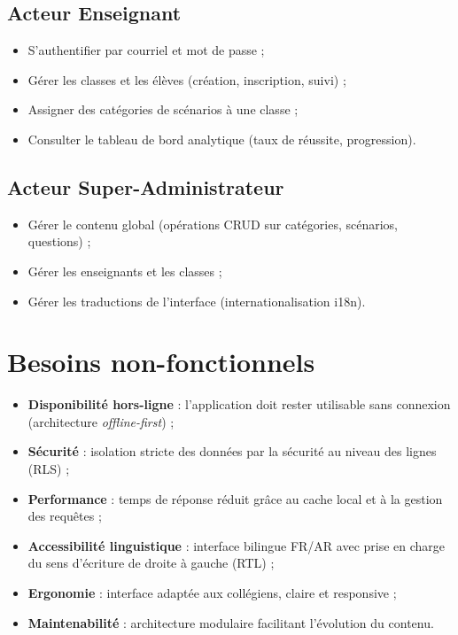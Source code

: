 \documentclass[12pt, a4paper, oneside]{report}
\begin{document}
\subsection{Acteur Enseignant}
\begin{itemize}[leftmargin=*]
  \item S'authentifier par courriel et mot de passe ;
  \item Gérer les classes et les élèves (création, inscription, suivi) ;
  \item Assigner des catégories de scénarios à une classe ;
  \item Consulter le tableau de bord analytique (taux de réussite, progression).
\end{itemize}

\subsection{Acteur Super-Administrateur}
\begin{itemize}[leftmargin=*]
  \item Gérer le contenu global (opérations CRUD sur catégories, scénarios, questions) ;
  \item Gérer les enseignants et les classes ;
  \item Gérer les traductions de l'interface (internationalisation i18n).
\end{itemize}

\section{Besoins non-fonctionnels}
\begin{itemize}[leftmargin=*]
  \item \textbf{Disponibilité hors-ligne} : l'application doit rester utilisable sans connexion (architecture \textit{offline-first}) ;
  \item \textbf{Sécurité} : isolation stricte des données par la sécurité au niveau des lignes (RLS) ;
  \item \textbf{Performance} : temps de réponse réduit grâce au cache local et à la gestion des requêtes ;
  \item \textbf{Accessibilité linguistique} : interface bilingue FR/AR avec prise en charge du sens d'écriture de droite à gauche (RTL) ;
  \item \textbf{Ergonomie} : interface adaptée aux collégiens, claire et responsive ;
  \item \textbf{Maintenabilité} : architecture modulaire facilitant l'évolution du contenu.
\end{itemize}
\end{document}
